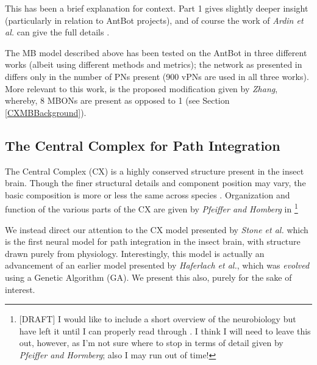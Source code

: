 \documentclass[a4paper,11pt,twoside,openright]{article}
\begin{document}
This has been a brief explanation for context. Part 1 gives slightly deeper
insight\cite{Mitchell2018} (particularly in relation to AntBot projects), and of
course the work of \textit{Ardin et al.} can give the full details
\cite{Ardin2016}.
\newline
\par

The MB model described above has been tested on the AntBot in three different
works (albeit using different methods and metrics); the network as presented in
\cite{Eberding2016, Zhang2017, Mitchell2018} differs only in the number of PNs
present (900 vPNs are used in all three works). More relevant to this work, is
the proposed modification given by \textit{Zhang}, whereby, 8 MBONs are present
as opposed to 1 (see Section \ref{CXMBBackground}).
\newline
\par

\subsection{ The Central Complex for Path Integration } \label{CXBackground}
The Central Complex (CX) is a highly conserved structure present in the insect
brain\cite{Pfeiffer2014, Stone2017}. Though the finer structural details and
component position may vary, the basic composition is more or less the same
across species \cite{Pfeiffer2014}. Organization and function of the
various parts of the CX are given by \textit{Pfeiffer and Homberg} in
\cite{Pfeiffer2014}\footnote{[DRAFT] I would like to include a short overview
  of the neurobiology but have left it until I can properly read through
  \cite{Pfeiffer2014}. I think I will need to leave this out, however, as I'm
  not sure where to stop in terms of detail given by
  \textit{Pfeiffer and Hormberg}; also I may run out of time!
}
\newline
\par

We instead direct our attention to the CX model presented by
\textit{Stone et al.} which is the first neural model for path integration
in the insect brain, with structure drawn purely from physiology. Interestingly,
this model is actually an advancement of an earlier model presented by
\textit{Haferlach et al.}, which was \textit{evolved} using a Genetic Algorithm
(GA). We present this also, purely for the sake of interest.
\end{document}
